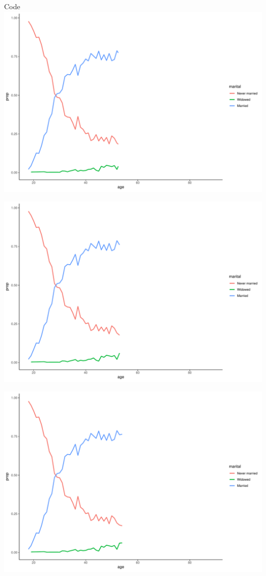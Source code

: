 \documentclass[
  ignorenonframetext,
]{beamer}
\begin{document}
\begin{frame}[fragile]{Code}
\includegraphics{gss_cat_files/figure-beamer/unnamed-chunk-1-53.pdf}

\includegraphics{gss_cat_files/figure-beamer/unnamed-chunk-1-54.pdf}

\includegraphics{gss_cat_files/figure-beamer/unnamed-chunk-1-55.pdf}


\end{frame}
\end{document}
